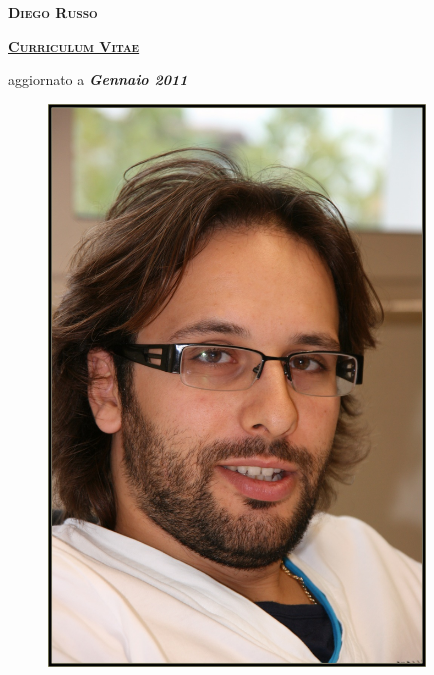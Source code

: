 \documentclass[totpages,helvetica,openbib,italian]{europecv}
\begin{document}
    \begin{center}
        \hspace{1pt}
        \vspace{2cm}
    
        {\scshape \textbf{\Huge Diego Russo}}
    
        \vspace{1cm}
    
        {\scshape \textbf{\Large \underline{Curriculum Vitae}}}
    
        \vspace{0.25cm}
    
        {\large aggiornato a \emph{\textbf{Gennaio 2011}}}
        
        \vspace{2cm}
        
        \begin{figure}[htbp] 
            \begin{center} 
                \includegraphics[width=10cm]{io.jpg}
            \end{center} 
        \end{figure}
        
    \end{center}
\pagebreak
{}
\end{document}
